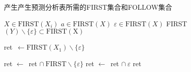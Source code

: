                 \begin{algorithm}
                    \caption{产生产生预测分析表所需的FIRST集合和FOLLOW集合}
                    \label{algorithm-generate-predict-table}
                    \begin{algorithmic}[1]
                                \State $X\in\mathrm{FIRST}(X_i)$
                                    \State $a\in\mathrm{FIRST}(X)$
                                \EndIf
                                    \State $\varepsilon\in\mathrm{FIRST}(X)$
                                \EndIf
                                    \State FIRST$(Y)\backslash\{\varepsilon\}\subset\mathrm{FIRST(X)}$
                                \EndIf
                            \EndIf
                        \EndFunction

                        \State {}
                            \State ret\ $\gets\mathrm{FIRST}(X_1)\backslash\{\varepsilon\}$
                        \iffalse
                            \State flag\ $\gets$\ True, $i\gets$\ 1, ret\ $\gets\mathrm{FIRST}(X_1)\backslash\{\varepsilon\}$
                            \While{flag}
                                \ForAll{$P\in$ FIRST$(X_i)\backslash\{\varepsilon\}$}
                                    \State ret$\gets$\ ret$\cap\{P\}$
                                \EndFor
                                \If{$\varepsilon\not\in$ FIRST$(X_i)$}
                                    \State flag\ $\gets$\ False
                                \EndIf
                            \EndWhile
                        \fi
                                \State ret $\gets$\ ret $\cap\ \mathrm{FIRST}\backslash\{\varepsilon\}$
                            \EndFor
                                \State ret $\gets$\ ret $\cap\ \varepsilon$
                            \EndIf
                            \State \Return ret
                        \EndFunction


\end{algorithmic}
\end{algorithm}
